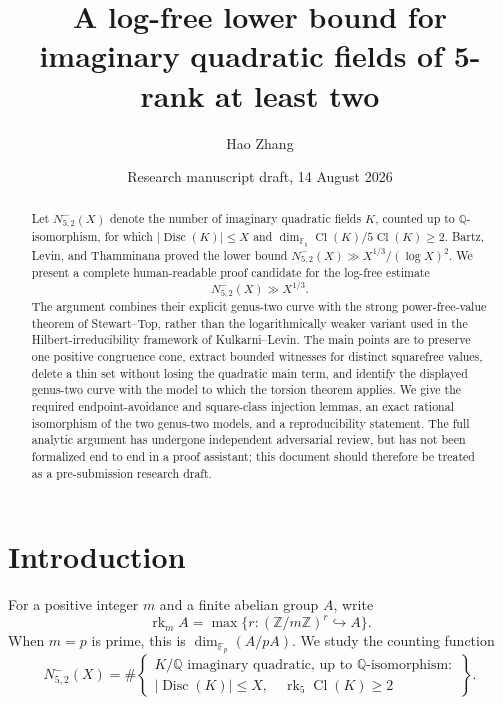 \documentclass[11pt,reqno]{amsart}
\title[A log-free lower bound for quadratic fields]{A log-free lower bound for imaginary quadratic fields of 5-rank at least two}
\author{Hao Zhang}
\date{Research manuscript draft, 14 August 2026}
\theoremstyle{definition}
\theoremstyle{remark}
\newcommand{\Q}{\mathbb{Q}}
\newcommand{\Z}{\mathbb{Z}}
\newcommand{\F}{\mathbb{F}}
\newcommand{\Cl}{\operatorname{Cl}}
\newcommand{\Disc}{\operatorname{Disc}}
\newcommand{\rk}{\operatorname{rk}}
\newcommand{\NoLogCount}{N^{-}_{5,2}}
\begin{document}
\begin{abstract}
Let \(\NoLogCount(X)\) denote the number of imaginary quadratic fields
\(K\), counted up to \(\Q\)-isomorphism, for which
\(\lvert\Disc(K)\rvert\leq X\) and
\(\dim_{\F_5}\Cl(K)/5\Cl(K)\geq 2\).  Bartz, Levin, and Thamminana
proved the lower bound
\(\NoLogCount(X)\gg X^{1/3}/(\log X)^2\).  We present a complete
human-readable proof candidate for the log-free estimate
\[
  \NoLogCount(X)\gg X^{1/3}.
\]
The argument combines their explicit genus-two curve with the strong
power-free-value theorem of Stewart--Top, rather than the logarithmically
weaker variant used in the Hilbert-irreducibility framework of
Kulkarni--Levin.  The main points are to preserve one positive congruence
cone, extract bounded witnesses for distinct squarefree values, delete a
thin set without losing the quadratic main term, and identify the displayed
genus-two curve with the model to which the torsion theorem applies.  We give
the required endpoint-avoidance and square-class injection lemmas, an exact
rational isomorphism of the two genus-two models, and a reproducibility
statement.  The full analytic argument has undergone independent adversarial
review, but has not been formalized end to end in a proof assistant; this
document should therefore be treated as a pre-submission research draft.
\end{abstract}

\maketitle

\section{Introduction}

For a positive integer \(m\) and a finite abelian group \(A\), write
\[
  \rk_m A=\max\{r:(\Z/m\Z)^r\hookrightarrow A\}.
\]
When \(m=p\) is prime, this is
\(\dim_{\F_p}(A/pA)\).  We study the counting function
\begin{equation}\label{eq:counting-function}
  \NoLogCount(X)
  =\#\left\{
  \begin{array}{c}
  K/\Q\text{ imaginary quadratic, up to }\Q\text{-isomorphism}:\\
  |\Disc(K)|\leq X,\quad \rk_5\Cl(K)\geq 2
  \end{array}
  \right\}.
\end{equation}
\end{document}
